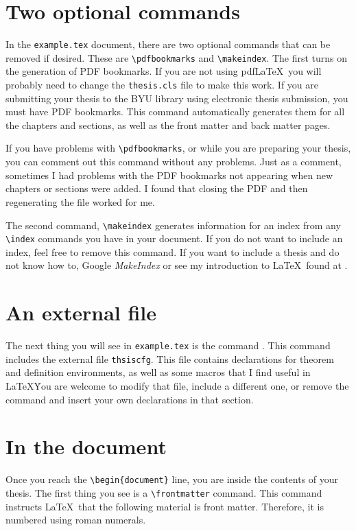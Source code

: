 \documentclass[12pt]{thesis}
\begin{document}
\section{Two optional commands}
In the \texttt{example.tex} document, there are two optional commands that can be removed if desired. These are \verb=\pdfbookmarks= and \verb=\makeindex=. The first turns on the generation of PDF bookmarks. If you are not using pdf\LaTeX\ you will probably need to change the \texttt{thesis.cls} file to make this work. If you are submitting your thesis to the BYU library using electronic thesis submission, you must have PDF bookmarks. This command automatically generates them for all the chapters and sections, as well as the front matter and back matter pages.

If you have problems with \verb=\pdfbookmarks=, or while you are preparing your thesis, you can comment out this command without any problems. Just as a comment, sometimes I had problems with the PDF bookmarks not appearing when new chapters or sections were added. I found that closing the PDF and then regenerating the file worked for me.

The second command, \verb=\makeindex= generates information for an index from any \verb=\index= commands you have in your document. If you do not want to include an index, feel free to remove this command. If you want to include a thesis and do not know how to, Google \textit{MakeIndex} or see my introduction to \LaTeX\, found at \cite{computation-page}.

\section{An external file}
The next thing you will see in \texttt{example.tex} is the command \verb==. This command includes the external file \texttt{thsiscfg}. This file contains declarations for theorem and definition environments, as well as some macros that I find useful in \LaTeX\. You are welcome to modify that file, include a different one, or remove the \verb== command and insert your own declarations in that section.

\section{In the document}
Once you reach the \verb=\begin{document}= line, you are inside the contents of your thesis. The first thing you see is a \verb=\frontmatter= command. This command instructs \LaTeX\ that the following material is front matter. Therefore, it is numbered using roman numerals.
\end{document}
